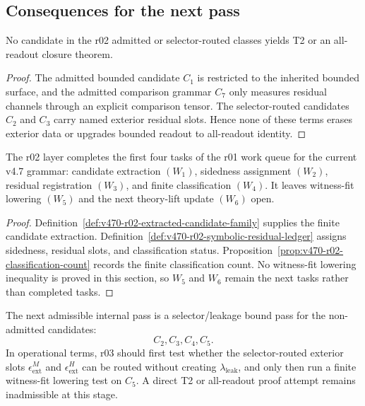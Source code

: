 \subsection{Consequences for the next pass}
\label{subsec:v470-r02-next-pass-consequences}

\begin{lemma}
\label{lem:v470-r02-no-silent-all-readout-lift}
No candidate in the r02 admitted or selector-routed classes yields T2 or an
all-readout closure theorem.
\end{lemma}

\begin{proof}
The admitted bounded candidate \(C_1\) is restricted to the inherited bounded
surface, and the admitted comparison grammar \(C_7\) only measures residual
channels through an explicit comparison tensor.  The selector-routed candidates
\(C_2\) and \(C_3\) carry named exterior residual slots.  Hence none of these
terms erases exterior data or upgrades bounded readout to all-readout identity.
\end{proof}

\begin{proposition}[r02 completion of \(W_1\)--\(W_4\)]
\label{prop:v470-r02-w1-w4-completion}
The r02 layer completes the first four tasks of the r01 work queue for the
current v4.7 grammar: candidate extraction \((W_1)\), sidedness assignment
\((W_2)\), residual registration \((W_3)\), and finite classification \((W_4)\).
It leaves witness-fit lowering \((W_5)\) and the next theory-lift update
\((W_6)\) open.
\end{proposition}

\begin{proof}
Definition~\ref{def:v470-r02-extracted-candidate-family} supplies the finite
candidate extraction.  Definition~\ref{def:v470-r02-symbolic-residual-ledger}
assigns sidedness, residual slots, and classification status.  Proposition~\ref{prop:v470-r02-classification-count}
records the finite classification count.  No witness-fit lowering inequality is
proved in this section, so \(W_5\) and \(W_6\) remain the next tasks rather than
completed tasks.
\end{proof}

\begin{corollary}
\label{cor:v470-r02-permitted-r03-direction}
The next admissible internal pass is a selector/leakage bound pass for the
non-admitted candidates:
\[
C_2,
C_3,
C_4,
C_5.
\]
In operational terms, r03 should first test whether the selector-routed exterior
slots \(\epsilon^{M}_{\mathrm{ext}}\) and \(\epsilon^{H}_{\mathrm{ext}}\) can be
routed without creating \(\lambda_{\mathrm{leak}}\), and only then run a finite
witness-fit lowering test on \(C_5\).  A direct T2 or all-readout proof attempt
remains inadmissible at this stage.
\end{corollary}

